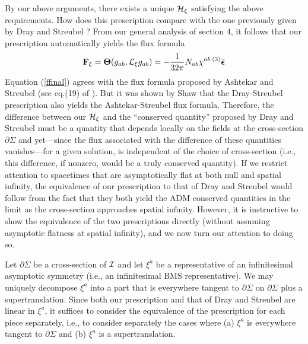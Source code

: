 By our above arguments, there exists a unique ${\cal H}_\xi$
satisfying the above requirements. How does this prescription compare
with the one previously given by Dray and Streubel \cite{ds}? From our
general analysis of section 4, it follows that our prescription
automatically yields the flux formula
\begin{equation}
{\bf F}_\xi = {\mbox{\boldmath $\Theta$}} (g_{ab}, {\cal L}_\xi
g_{ab}) = - \frac{1}{32 \pi} N_{ab} \chi^{ab} \, {}^{(3)}
\bar{\mbox{\boldmath $\epsilon$}}
\label{ffinal}
\end{equation}
Equation
(\ref{ffinal}) agrees with the flux formula proposed by Ashtekar and
Streubel \cite{as} (see eq.(19) of \cite{aw}). But it was shown by
Shaw \cite{s} that the Dray-Streubel prescription also yields the
Ashtekar-Streubel flux formula. Therefore, the difference between our
${\cal H}_\xi$ and the ``conserved quantity'' proposed by Dray and
Streubel must be a quantity that depends locally on the fields at the
cross-section $\partial \Sigma$ and yet---since the flux associated
with the difference of these quantities vanishes---for a given
solution, is independent of the choice of cross-section (i.e., this
difference, if nonzero, would be a truly conserved quantity). If we restrict
attention to spacetimes that are asymptotically flat at both null and
spatial infinity, the equivalence of our prescription to that of Dray
and Streubel would follow from the fact that they both yield the ADM
conserved quantities in the limit as the cross-section approaches
spatial infinity. However, it is instructive to show the
equivalence of the two prescriptions directly (without assuming
asymptotic flatness at spatial infinity), and we now turn our
attention to doing so.

Let $\partial \Sigma$ be a cross-section of ${\cal I}$ and let $\xi^a$
be a representative of an infinitesimal asymptotic symmetry (i.e., an
infinitesimal BMS representative). We may uniquely decompose $\xi^a$
into a part that is everywhere tangent to $\partial \Sigma$ on
$\partial \Sigma$ plus a supertranslation. Since both our prescription
and that of Dray and Streubel are linear in $\xi^a$, it suffices to
consider the equivalence of the prescription for each piece
separately, i.e., to consider separately the cases where (a) $\xi^a$
is everywhere tangent to $\partial \Sigma$ and (b) $\xi^a$ is a
supertranslation.


